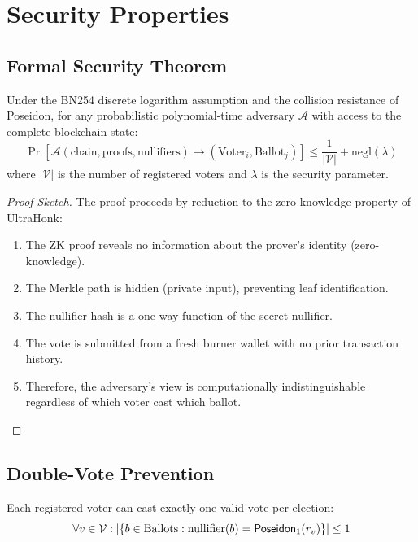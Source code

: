 \section{Security Properties}

\subsection{Formal Security Theorem}

\begin{theorem}
\label{thm:unlinkability}
Under the BN254 discrete logarithm assumption and the collision resistance of Poseidon, for any probabilistic polynomial-time adversary $\mathcal{A}$ with access to the complete blockchain state:
\begin{equation}
\Pr\left[\mathcal{A}(\text{chain}, \text{proofs}, \text{nullifiers}) \to (\text{Voter}_i, \text{Ballot}_j)\right] \leq \frac{1}{|\mathcal{V}|} + \text{negl}(\lambda)
\end{equation}
where $|\mathcal{V}|$ is the number of registered voters and $\lambda$ is the security parameter.
\end{theorem}

\begin{proof}[Proof Sketch]
The proof proceeds by reduction to the zero-knowledge property of UltraHonk:
\begin{enumerate}
    \item The ZK proof reveals no information about the prover's identity (zero-knowledge).
    \item The Merkle path is hidden (private input), preventing leaf identification.
    \item The nullifier hash is a one-way function of the secret nullifier.
    \item The vote is submitted from a fresh burner wallet with no prior transaction history.
    \item Therefore, the adversary's view is computationally indistinguishable regardless of which voter cast which ballot.
\end{enumerate}
\end{proof}

\subsection{Double-Vote Prevention}

\begin{property}[Uniqueness]
Each registered voter can cast exactly one valid vote per election:
\begin{equation}
\forall v \in \mathcal{V}: |\{b \in \text{Ballots} : \text{nullifier}(b) = \mathsf{Poseidon}_1(r_v)\}| \leq 1
\end{equation}
\end{property}

